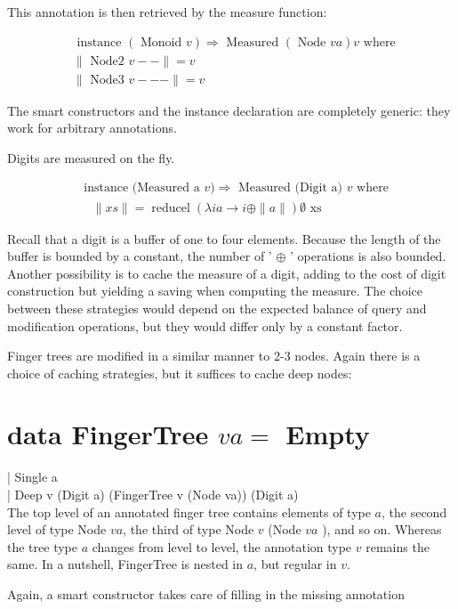 \documentclass[10pt]{article}
\begin{document}
This annotation is then retrieved by the measure function:

$$
\begin{aligned}
& \text { instance }(\text { Monoid } v) \Rightarrow \text { Measured }(\text { Node } v a) v \text { where } \\
& \| \text { Node2 } v--\|=v \\
& \| \text { Node3 } v---\|=v
\end{aligned}
$$

The smart constructors and the instance declaration are completely generic: they work for arbitrary annotations.

Digits are measured on the fly.

$$
\begin{aligned}
& \text { instance (Measured a } v) \Rightarrow \text { Measured (Digit a) } v \text { where } \\
& \quad\|x s\|=\operatorname{reducel}(\lambda i a \rightarrow i \oplus\|a\|) \emptyset \text { xs }
\end{aligned}
$$

Recall that a digit is a buffer of one to four elements. Because the length of the buffer is bounded by a constant, the number of ' $\oplus$ ' operations is also bounded. Another possibility is to cache the measure of a digit, adding to the cost of digit construction but yielding a saving when computing the measure. The choice between these strategies would depend on the expected balance of query and modification operations, but they would differ only by a constant factor.

Finger trees are modified in a similar manner to 2-3 nodes. Again there is a choice of caching strategies, but it suffices to cache deep nodes:

\section*{data FingerTree $v a=$ Empty}
| Single a\\
| Deep v (Digit a) (FingerTree v (Node va)) (Digit a)\\
The top level of an annotated finger tree contains elements of type $a$, the second level of type Node $v a$, the third of type Node $v$ (Node $v a$ ), and so on. Whereas the tree type $a$ changes from level to level, the annotation type $v$ remains the same. In a nutshell, FingerTree is nested in $a$, but regular in $v$.

Again, a smart constructor takes care of filling in the missing annotation
\end{document}
